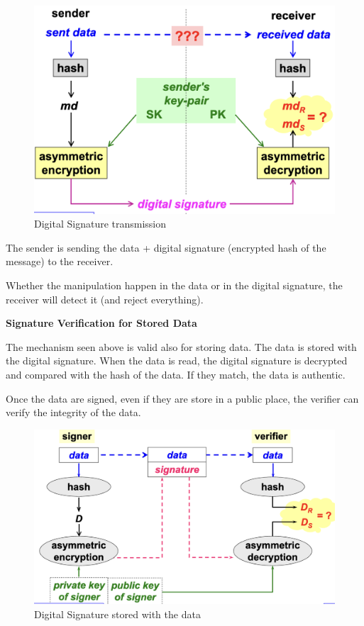 \begin{figure}[H]
    \centering
    \includegraphics[width=0.4\linewidth]{Images/Cryptography/ds.png}
    \caption{Digital Signature transmission}
\end{figure}
\begin{tcolorbox}[colback=red!10!white, colframe=red!70!black, coltitle=white, title=For the Exam]
    The sender is sending the data + digital signature (encrypted hash of the message) to the receiver. 
    
    \vspace{0.2cm}
    
    Whether the manipulation happen in the data or in the digital signature, the receiver will detect it (and reject everything).
\end{tcolorbox}


\begin{center}
    \textbf{Signature Verification for Stored Data}
\end{center}

The mechanism seen above is valid also for storing data. The data is stored with the digital signature. When the data is read, the digital signature is decrypted and compared with the hash of the data. If they match, the data is authentic.
\begin{tcolorbox}[colback=blue!10!white, colframe=blue!50!white]
Once the data are signed, even if they are store in a public place, the verifier can verify the integrity of the data.
\end{tcolorbox}

\begin{figure}[H]
    \centering
    \includegraphics[width=0.6\linewidth]{Images/Cryptography/ds_storing.png}
    \caption{Digital Signature stored with the data}
\end{figure}

